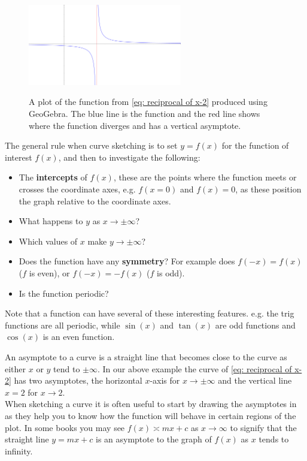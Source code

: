 \begin{figure}[ht]
    \centering

  \includegraphics[width=0.6\textwidth, alt={A plot of the reciprocal of (x-2) which tends to zero as x goes to either plus or minus infinity and diverges as x tends to 2.}]{figures/asymptotes}
    \caption{A plot of the function from \cref{eq: reciprocal of x-2} produced using GeoGebra. The blue line is the function and the red line shows where the function diverges and has a vertical asymptote.}
\label{fig: asymptotes function}
\end{figure}

The general rule when curve sketching is to set $y=f(x)$ for the function of interest $f(x)$, and then to investigate the following:
\begin{itemize}
    \item The \textbf{intercepts} of $f(x)$, these are the points where the function meets or crosses the coordinate axes, e.g. $f(x=0)$ and $f(x)=0$, as these position the graph relative to the coordinate axes.
    \item What happens to $y$ as $x\to\pm\infty$?
   \item Which values of $x$ make $y\to \pm\infty$?
   \item Does the function have any \textbf{symmetry}? For example does $f(-x)=f(x)$ ($f$ is even), or $f(-x)=-f(x)$ ($f$ is odd).
   \item Is the function periodic? 
\end{itemize}
Note that a function can have several of these interesting features. e.g. the trig functions are all periodic, while $\sin(x)$ and $\tan(x)$ are odd functions and $\cos(x)$ is an even function.

\begin{mdiv}
An asymptote to a curve is a straight line that becomes close to the curve as either $x$ or $y$ tend to $\pm\infty$. In our above example the curve of \cref{eq: reciprocal of x-2} has two asymptotes, the horizontal $x$-axis for $x\to \pm\infty$ and the vertical line $x=2$ for $x\to 2$.\\

When sketching a curve it is often useful to start by drawing the asymptotes in as they help you to know how the function will behave in certain regions of the plot. In some books you may see $f(x)\asymp mx +c$ as $x\to \infty$ to signify that the straight line $y=mx+c$ is an asymptote to the graph of $f(x)$ as $x$ tends to infinity.
\end{mdiv}

